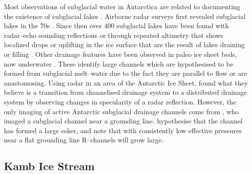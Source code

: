 Most observations of subglacial water in Antarctica are related to documenting the existence of subglacial lakes \citep[e.g.][]{carter2007radar,wright2012fourth,siegfried2018thirteen}.
Airborne radar surveys first revealed subglacial lakes in the 70s \citep{robin1970radio}. Since then over 400 subglacial lakes have been found \citep{siegert2016recent} with radar--echo sounding reflections \cite[e.g.][]{carter2007radar} or through repeated altimetry that shows localized drops or uplifting in the ice surface that are the result of lakes draining or filling \citep{wingham2006rapid, stearns2008increased, gray2005evidence, fricker2007active}. 
Other drainage features have been observed in paleo ice sheet beds, now underwater  \cite[e.g.][]{nitsche2013paleo, anderson2008geomorphology}. These identify large channels which are hypothesised to be formed from subglacial melt--water due to the fact they are parallel to flow or are anastomosing.  Using radar in an area of the Antarctic Ice Sheet, \cite{schroeder2013evidence} found what they believe is a transition from channelised drainage system to a distributed drainage system by observing changes in specularity of a radar reflection. However, the only imaging of active Antarctic subglacial drainage channels come from \cite{drews2017actively}, who imaged a subglacial channel near a grounding line. \cite{drews2017actively} hypothesise that the channel has formed a large esker, and note that with consistently low effective pressures near a flat grounding line R--channels will grow large.

\subsection{Kamb Ice Stream}

